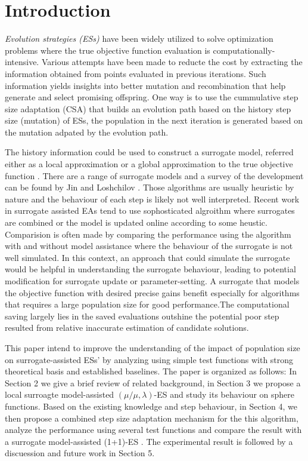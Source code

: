 \section{Introduction}

\textit{Evolution strategies (ESs)} have been widely utilized to solve optimization problems where the true objective function evaluation is computationally-intensive. Various attempts have been made to reducte the cost by extracting the information obtained from points evaluated in previous iterations. Such information yields insights into better mutation and recombination that help generate and select promising offspring. One way is to use the cummulative step size adaptation (CSA) \cite{Ostermeier:1994:DAS:1326675.1326679} that builds an evolution path based on the history step size (mutation) of ESs, the population in the next iteration is generated based on the mutation adpated by the evolution path. 

The history information could be used to construct a surrogate model, referred either as a local approximation or a global approximation to the true objective function \cite{Jin:2002:FAE:2955491.2955686}. There are a range of surrogate models and a survey of the development can be found by Jin \cite{JIN201161} and Loshchilov \cite{ECJ2016_LMCMA}. Those algorithms are usually heuristic by nature and the behaviour of each step is likely not well interpreted. Recent work in surrogate assisted EAs tend to use sophosticated algroithm where surrogates are combined or the model is updated online according to some heustic. Comparision is often made by comparing the performance using the algorithm with and without model assistance where the behaviour of the surrogate is not well simulated. In this context, an approach that could simulate the surrogate would be helpful in understanding the surrogate behaviour, leading to potential modification for surrogate update or parameter-setting. A surrogate that models the objective function with desired precise gains benefit especially for algorithms that requires a large population size for good performance.The computational saving largely lies in the saved evaluations outshine the potential poor step resulted from relative inaccurate estimation of candidate solutions. 


This paper intend to improve the understanding of the impact of population size on surrogate-assisted ESs' by analyzing using simple test functions with strong theoretical basis and established baselines. The paper is organized as follows: In Section 2 we give a brief review of related background, in Section 3 we propose a local surroagte model-assisted $(\mu/\mu,\lambda)$-ES and study its behaviour on sphere functions. Based on the existing knowledge and step behaviour, in Section 4, we then propose a combined step size adaptation mechanism for the this algorithm, analyze the performance using several test functions and compare the result with a surrogate model-assisted (1+1)-ES \cite{DBLP:conf/ppsn/KayhaniA18}. The experimental result is followed by a discuession and future work in Section 5. 




